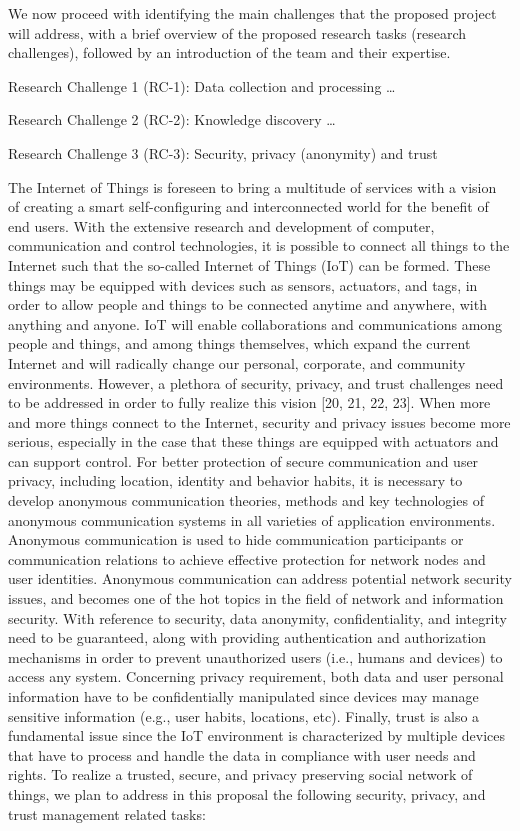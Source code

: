 We now proceed with identifying the main challenges that the proposed project will address, with a brief overview of the proposed research tasks (research challenges), followed by an introduction of the team and their expertise.


Research Challenge 1 (RC-1): Data collection and processing
…



Research Challenge 2 (RC-2): Knowledge discovery
…


Research Challenge 3 (RC-3): Security, privacy (anonymity) and trust

The Internet of Things is foreseen to bring a multitude of services with a vision of creating a smart self-configuring and interconnected world for the benefit of end users. With the extensive research and development of computer, communication and control technologies, it is possible to connect all things to the Internet such that the so-called Internet of Things (IoT) can be formed. These things may be equipped with devices such as sensors, actuators, and tags, in order to allow people and things to be connected anytime and anywhere, with anything and anyone. IoT will enable collaborations and communications among people and things, and among things themselves, which expand the current Internet and will radically change our personal, corporate, and community environments. However, a plethora of security, privacy, and trust challenges need to be addressed in order to fully realize this vision [20, 21, 22, 23]. When more and more things connect to the Internet, security and privacy issues become more serious, especially in the case that these things are equipped with actuators and can support control.
For better protection of secure communication and user privacy, including location, identity and behavior habits, it is necessary to develop anonymous communication theories, methods and key technologies of anonymous communication systems in all varieties of application environments. Anonymous communication is used to hide communication participants or communication relations to achieve effective protection for network nodes and user identities. Anonymous communication can address potential network security issues, and becomes one of the hot topics in the field of network and information security. With reference to security, data anonymity, confidentiality, and integrity need to be guaranteed, along with providing authentication and authorization mechanisms in order to prevent unauthorized users (i.e., humans and devices) to access any system. Concerning privacy requirement, both data and user personal information have to be confidentially manipulated since devices may manage sensitive information (e.g., user habits, locations, etc). Finally, trust is also a fundamental issue since the IoT environment is characterized by multiple devices that have to process and handle the data in compliance with user needs and rights.
To realize a trusted, secure, and privacy preserving social network of things, we plan to address in this proposal the following security, privacy, and trust management related tasks:

